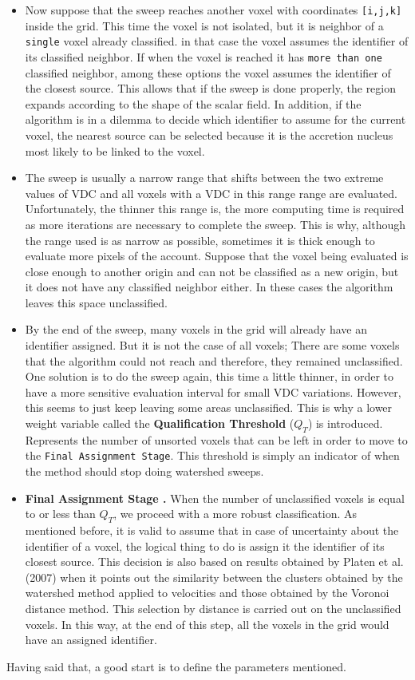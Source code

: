 \documentclass[a4paper,fleqn,usenatbib]{mnras}
\begin{document}
\begin{itemize}
    \item Now suppose that the sweep reaches another voxel with coordinates \texttt{[i,j,k]} inside the grid. This time the voxel is not isolated, but it is neighbor of a \texttt{single} voxel already classified. in that case the voxel assumes the identifier of its classified neighbor. If when the voxel is reached it has \texttt{more than one} classified neighbor, among these options the voxel assumes the identifier of the closest source. This allows that if the sweep is done properly, the region expands according to the shape of the scalar field. In addition, if the algorithm is in a dilemma to decide which identifier to assume for the current voxel, the nearest source can be selected because it is the accretion nucleus most likely to be linked to the voxel.
    \item The sweep is usually a narrow range that shifts between the two extreme values of VDC and all voxels with a VDC in this range range are evaluated. Unfortunately, the thinner this range is, the more computing time is required as more iterations are necessary to complete the sweep. This is why, although the range used is as narrow as possible, sometimes it is thick enough to evaluate more pixels of the account. Suppose that the voxel being evaluated is close enough to another origin and can not be classified as a new origin, but it does not have any classified neighbor either. In these cases the algorithm leaves this space unclassified.
    \item By the end of the sweep, many voxels in the grid will already have an identifier assigned. But it is not the case of all voxels; There are some voxels that the algorithm could not reach and therefore, they remained unclassified. One solution is to do the sweep again, this time a little thinner, in order to have a more sensitive evaluation interval for small VDC variations. However, this seems to just keep leaving some areas unclassified. This is why a lower weight variable called the \textbf{Qualification Threshold} ($Q_T$) is introduced. Represents the number of unsorted voxels that can be left in order to move to the \texttt{Final Assignment Stage}. This threshold is simply an indicator of when the method should stop doing watershed sweeps.
    \item \textbf{Final Assignment Stage .} When the number of unclassified voxels is equal to or less than $Q_T$, we proceed with a more robust classification. As mentioned before, it is valid to assume that in case of uncertainty about the identifier of a voxel, the logical thing to do is assign it the identifier of its closest source. This decision is also based on results obtained by Platen et al. (2007)\cite{CosmicWatershedVoidDetection} when it points out the similarity between the clusters obtained by the watershed method applied to velocities and those obtained by the Voronoi distance method. This selection by distance is carried out on the unclassified voxels. In this way, at the end of this step, all the voxels in the grid would have an assigned identifier.
\end{itemize}
Having said that, a good start is to define the parameters mentioned.
\end{document}
